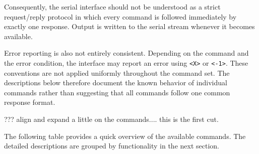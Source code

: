 Consequently, the serial interface should not be understood as a strict
request/reply protocol in which every command is followed immediately by
exactly one response. Output is written to the serial stream whenever it
becomes available.

Error reporting is also not entirely consistent. Depending on the command
and the error condition, the interface may report an error using
\texttt{<X>} or \texttt{<-1>}. These conventions are not applied uniformly
throughout the command set. The descriptions below therefore document the
known behavior of individual commands rather than suggesting that all
commands follow one common response format.


??? align and expand a little on the commands.... this is the first cut.


The following table provides a quick overview of the available commands.
The detailed descriptions are grouped by functionality in the next section.

